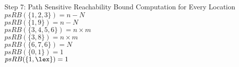 Step 7: Path Sensitive Reachability Bound Computation for Every Location
$psRB(\{1, 2, 3\}) = n - N$ \\
$psRB(\{1, 9\}) = n - N$ \\
$psRB(\{3, 4, 5, 6\}) = n \times m$ \\
$psRB(\{3, 8\}) = n \times m$ \\
$psRB(\{6, 7, 6\}) = N$ \\
$psRB(\{0, 1\}) = 1$ \\
$psRB(\{1, \lex\}) = 1$ 